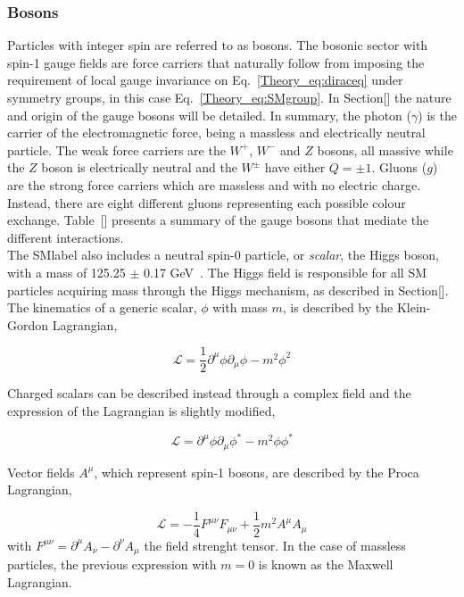 \subsubsection{Bosons}

Particles with integer spin are referred to as bosons. The bosonic sector with spin-1 gauge fields are force carriers that naturally follow from imposing the requirement of local gauge invariance on Eq.~\ref{Theory_eq:diraceq} under symmetry groups, in this case Eq.~\ref{Theory_eq:SMgroup}. In Section[] the nature and origin of the gauge bosons will be detailed. In summary, the photon ($\gamma$) is the carrier of the electromagnetic force, being a massless and electrically neutral particle. The weak force carriers are the $W^+$, $W^-$ and $Z$ bosons, all massive while the $Z$ boson is electrically neutral and the $W^\pm$ have either $Q=\pm1$. Gluons ($g$) are the strong force carriers which are massless and with no electric charge. Instead, there are eight different gluons representing each possible colour exchange. Table~[] presents a summary of the gauge bosons that mediate the different interactions.\\

The \acrshort{SMlabel} also includes a neutral spin-0 particle, or \textit{scalar}, the Higgs boson, with a mass of 125.25 $\pm$ 0.17 GeV~\cite{pdg}. The Higgs field is responsible for all SM particles acquiring mass through the Higgs mechanism, as described in Section[].
The kinematics of a generic scalar, $\phi$ with mass $m$, is described by the Klein-Gordon Lagrangian,

\begin{equation}
    \label{Theory_eq:KGeq}
    \mathcal{L}=\frac{1}{2}\partial^\mu\phi\partial_\mu\phi - m^2\phi^2
\end{equation}

Charged scalars can be described instead through a complex field and the expression of the Lagrangian is slightly modified,

\begin{equation}
    \label{Theory_eq:KGeqcharged}
    \mathcal{L}=\partial^\mu\phi\partial_\mu\phi^* - m^2\phi\phi^*
\end{equation}

Vector fields $A^\mu$, which represent spin-1 bosons, are described by the Proca Lagrangian,

\begin{equation}
    \label{Theory_eq:Proca}
    \mathcal{L}=-\frac{1}{4}F^{\mu\nu}F_{\mu\nu}+\frac{1}{2}m^2A^\mu A_\mu
\end{equation}
with $F^{\mu\nu}=\partial^\mu A_\nu -\partial^\nu A_\mu$ the field strenght tensor. In the case of massless particles, the previous expression with $m=0$ is known as the Maxwell Lagrangian.

